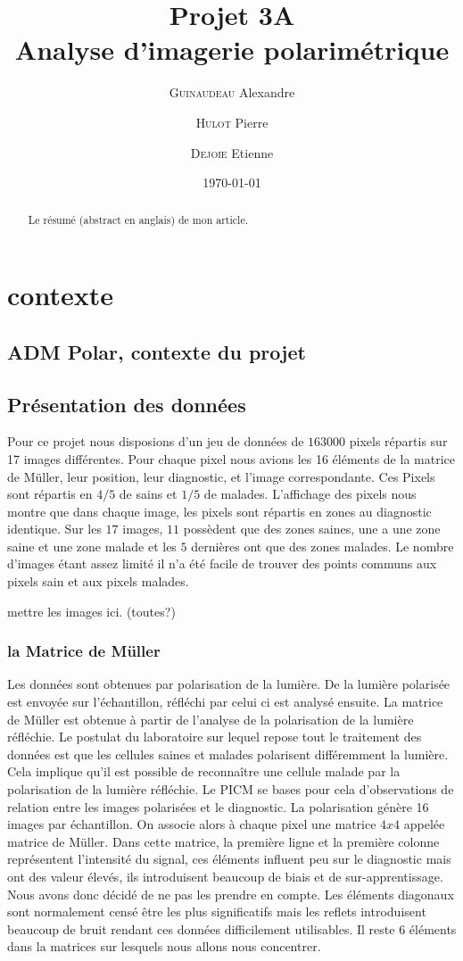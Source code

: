 \documentclass[a4paper,10pt]{report}
\title{Projet 3A\\Analyse d'imagerie polarimétrique}
\author{\textsc{Guinaudeau} Alexandre\\
	\and 
	\textsc{Hulot} Pierre
	\and 
	\textsc{Dejoie} Etienne	
	}
\date{\today}
\begin{document}
\maketitle

\begin{abstract}
Le résumé (abstract en anglais) de mon article.
\end{abstract}

\chapter{contexte}
\section{ADM Polar, contexte du projet}
\section{Présentation des données}
Pour ce projet nous disposions d'un jeu de données de $163 000$ pixels répartis sur 17 images différentes. Pour chaque pixel nous avions les 16 éléments de la matrice de Müller, leur position, leur diagnostic, et l'image correspondante.
Ces Pixels sont répartis en $4/5$ de sains et $1/5$ de malades. L'affichage des pixels nous montre que dans chaque image, les pixels sont répartis en zones au diagnostic identique. Sur les $17$ images, $11$ possèdent que des zones saines, une a une zone saine et une zone malade et les $5$ dernières ont que des zones malades. Le nombre d'images étant assez limité il n'a été facile de trouver des points communs aux pixels sain et aux pixels malades.


mettre les images ici. (toutes?)

\subsection{la Matrice de Müller}
Les données sont obtenues par polarisation de la lumière. De la lumière polarisée est envoyée sur l'échantillon, réfléchi par celui ci est analysé ensuite.
La matrice de Müller est obtenue à partir de l'analyse de la polarisation de la lumière réfléchie. Le postulat du laboratoire sur lequel repose tout le traitement des données est que les cellules saines et malades polarisent différemment la lumière. Cela implique qu'il est possible de reconnaître une cellule malade par la polarisation de la lumière réfléchie.
Le PICM se bases pour cela d'observations de relation entre les images polarisées et le diagnostic. 
La polarisation génère 16 images par échantillon. On associe alors à chaque pixel une matrice $4x4$ appelée matrice de Müller. Dans cette matrice, la première ligne et la première colonne représentent l'intensité du signal, ces éléments influent peu sur le diagnostic mais ont des valeur élevés, ils introduisent beaucoup de biais et de sur-apprentissage. Nous avons donc décidé de ne pas les prendre en compte. Les éléments diagonaux sont normalement censé être les plus significatifs mais les reflets introduisent beaucoup de bruit rendant ces données difficilement utilisables. Il reste 6 éléments dans la matrices sur lesquels nous allons nous concentrer. 
\end{document}

